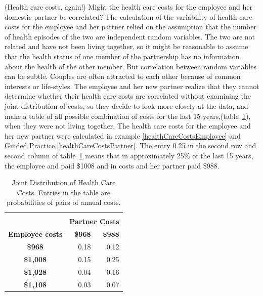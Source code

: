 \begin{example} (Health care costs, again!) Might the health care costs for the employee and her domestic partner be correlated? The calculation of the variability of health care costs for the employee and her partner relied on the assumption that the number of health episodes of the two are independent random variables.  The two are not related and have not been living together, so it might be reasonable to assume that the health status of one member of the partnership has no information about the health of the other member.  But correlation between random variables can be subtle.   Couples are often attracted to each other because of common interests or life-styles.  The employee and her new partner realize that they cannot determine whether their health care costs are correlated without examining the joint distribution of costs, so they decide to look more closely at the data, and make a table of all possible combination of costs for the last 15 years,(table~\ref{healthExpensesJointDistribution}), when they were not living together. The health care costs for the employee and her new partner were calculated in example \ref{healthCareCostsEmployee} and Guided Practice \ref{healthCareCostsPartner}.   The entry 0.25 in the second row and second column of table~\ref{healthExpensesJointDistribution} means that in approximately 25\% of the last 15 years, the employee and paid \$1008 and in costs and her partner paid \$988.
\begin{table}[h]
\centering
\begin{tabular}{crr}
  \hline \\
  &   \multicolumn{2}{c}{\textbf{Partner Costs}} \\
\textbf{Employee costs} & \textbf{\$968} & \textbf{\$988} \\ 
  \hline
\textbf{\$968} & 0.18 & 0.12 \\ 
 \textbf{\$1,008} & 0.15 & 0.25 \\ 
 \textbf{\$1,028}  & 0.04 & 0.16 \\ 
 \textbf{\$1,108}  & 0.03 & 0.07 \\ 
   \hline
\end{tabular}
\caption{Joint Distribution of Health Care Costs. Entries in the table are probabilities of pairs of annual costs.} 
\label{healthExpensesJointDistribution}
\end{table}
\end{example}

